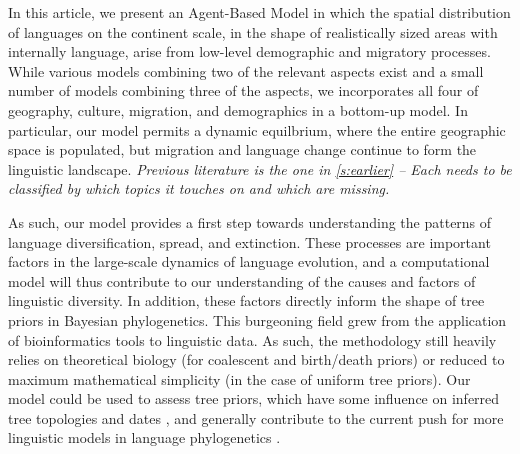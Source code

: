 \documentclass[a4paper,12pt]{scrartcl}
\begin{document}
In this article, we present an Agent-Based Model in which the spatial
distribution of languages on the continent scale, in the shape of realistically
sized areas with internally language, arise from low-level demographic and
migratory processes. 
While various models combining two of the relevant aspects exist and a small
number of models combining three of the aspects, we incorporates all four of
geography, culture, migration, and demographics in a bottom-up model.
In particular, our model permits a dynamic equilbrium, where the entire
geographic space is populated, but migration and language change continue to
form the linguistic landscape.
\emph{Previous literature is the one in \cref{s:earlier} – Each needs to be
  classified by which topics it touches on and which are missing.}

As such, our model provides a first step towards understanding the patterns of
language diversification, spread, and extinction. These processes are important
factors in the large-scale dynamics of language evolution, and a computational
model will thus contribute to our understanding of the causes and factors of
linguistic diversity.
In addition, these factors directly inform the
shape of tree priors in Bayesian phylogenetics. This burgeoning field
\parencite{jager,bouckaert,gray,sino-tibetan} grew from the application of
bioinformatics tools to linguistic data. As such, the methodology still heavily
relies on theoretical biology (for coalescent and birth/death priors) or reduced
to maximum mathematical simplicity (in the case of uniform tree priors). Our
model could be used to assess tree priors, which have some influence on inferred
tree topologies and dates \cite{rama2018three}, and generally contribute to the
current push for more linguistic models in language phylogenetics
\parencite{stochasticdollo,dollowithlateraltransfers,neureiter,maurits-rakes,kaiping-tap}.
\end{document}
